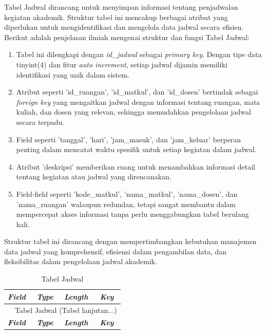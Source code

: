 \begin{enumerate}
	      Tabel Jadwal dirancang untuk menyimpan informasi tentang penjadwalan kegiatan akademik. Struktur tabel ini mencakup berbagai atribut yang diperlukan untuk mengidentifikasi dan mengelola data jadwal secara efisien. Berikut adalah penjelasan ilmiah mengenai struktur dan fungsi Tabel Jadwal:

	      \begin{enumerate}[label=\alph*.]
		      \item Tabel ini dilengkapi dengan \textit{id\_jadwal} sebagai \textit{primary key}. Dengan tipe data tinyint(4) dan fitur \textit{auto increment}, setiap jadwal dijamin memiliki identifikasi yang unik dalam sistem.
		      \item Atribut seperti 'id\_ruangan', 'id\_matkul', dan 'id\_dosen' bertindak sebagai \textit{foreign key} yang mengaitkan jadwal dengan informasi tentang ruangan, mata kuliah, dan dosen yang relevan, sehingga memudahkan pengelolaan jadwal secara terpadu.
		      \item Field seperti 'tanggal', 'hari', 'jam\_masuk', dan 'jam\_keluar' berperan penting dalam mencatat waktu spesifik untuk setiap kegiatan dalam jadwal.
		      \item Atribut 'deskripsi' memberikan ruang untuk menambahkan informasi detail tentang kegiatan atau jadwal yang direncanakan.
		      \item Field-field seperti 'kode\_matkul', 'nama\_matkul', 'nama\_dosen', dan 'nama\_ruangan' walaupun redundan, tetapi sangat membantu dalam mempercepat akses informasi tanpa perlu menggabungkan tabel berulang kali.
	      \end{enumerate}

	      Struktur tabel ini dirancang dengan mempertimbangkan kebutuhan manajemen data jadwal yang komprehensif, efisiensi dalam pengambilan data, dan fleksibilitas dalam pengelolaan jadwal akademik.

		      {
			      \selectfont
			      \begin{longtable}{l l l l}
				      \caption{Tabel Jadwal}
				      \label{admin}                                                                                       \\
				      \hline
				      \textbf{\textit{Field}} & \textbf{\textit{Type}} & \textbf{\textit{Length}} & \textbf{\textit{Key}} \\
				      \hline
				      \endfirsthead

				      \multicolumn{4}{c}{\tablename\ \thetable\ {Tabel Jadwal} \space (Tabel lanjutan...)}                \\
				      \hline
				      \textbf{\textit{Field}} & \textbf{\textit{Type}} & \textbf{\textit{Length}} & \textbf{\textit{Key}} \\
				      \hline
				      \endhead


\end{longtable}}
\end{enumerate}
